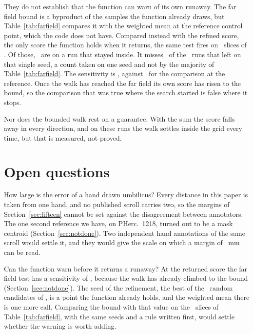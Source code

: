 They do not establish that the function can warn of its own runaway. The far field bound is a
byproduct of the samples the function already draws, but Table~\ref{tab:farfield} compares it with
the weighted mean at the reference control point, which the code does not have. Compared instead
with the refined score, the only score the function holds when it returns, the same test fires on
\RevFarWarnPredictedYes\ slices of \RevFarSlicesTotal. Of those, \RevFarWarnFalsePos\ are on a run
that stayed inside. It misses \RevFarWarnFalseNeg\ of the \RevFarWarnRunaways\ runs that left on
that single seed, a count taken on one seed and not by the majority of Table~\ref{tab:farfield}.
The sensitivity is \RevFarWarnSensitivity, against \RevFarSensitivity\ for the comparison at the
reference. Once the walk has reached the far field its own score has risen to the bound, so the
comparison that was true where the search started is false where it stops.

Nor does the bounded walk rest on a guarantee. With the sum the score falls away in every direction,
and on these runs the walk settles inside the grid every time, but that is measured, not proved.

\section{Open questions}
\label{sec:open}

How large is the error of a hand drawn umbilicus? Every distance in this paper is taken from one
hand, and no published scroll carries two, so the margins of Section~\ref{sec:fifteen} cannot be
set against the disagreement between annotators. The one second reference we have, on PHerc.\ 1218,
turned out to be a mask centroid (Section~\ref{sec:notdone}). Two independent hand annotations of
the same scroll would settle it, and they would give the scale on
which a margin of \UmbThresholdMm~mm can be read.

Can the function warn before it returns a runaway? At the returned score the far field test has a
sensitivity of \RevFarWarnSensitivity, because the walk has already climbed to the bound
(Section~\ref{sec:notdone}). The seed of the refinement, the best of the \RevSeedCandidates\ random
candidates of , is a point the function already holds, and the weighted mean there
is one more call. Comparing the bound with that value on the \RevFarSlicesTotal\ slices of
Table~\ref{tab:farfield}, with the same seeds and a rule written first, would settle whether the
warning is worth adding.

